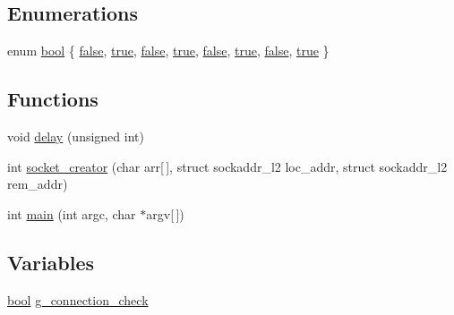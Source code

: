 \subsection*{Enumerations}
\begin{DoxyCompactItemize}
\item 
enum \mbox{\hyperlink{piconet_2l2cap-server_8c_af6a258d8f3ee5206d682d799316314b1}{bool}} \{ \newline
\mbox{\hyperlink{piconet_2l2cap-client_8c_af6a258d8f3ee5206d682d799316314b1ae9de385ef6fe9bf3360d1038396b884c}{false}}, 
\mbox{\hyperlink{piconet_2l2cap-client_8c_af6a258d8f3ee5206d682d799316314b1a08f175a5505a10b9ed657defeb050e4b}{true}}, 
\mbox{\hyperlink{piconet_2l2cap-server_8c_af6a258d8f3ee5206d682d799316314b1ae9de385ef6fe9bf3360d1038396b884c}{false}}, 
\mbox{\hyperlink{piconet_2l2cap-server_8c_af6a258d8f3ee5206d682d799316314b1a08f175a5505a10b9ed657defeb050e4b}{true}}, 
\newline
\mbox{\hyperlink{connection__handler_8c_af6a258d8f3ee5206d682d799316314b1ae9de385ef6fe9bf3360d1038396b884c}{false}}, 
\mbox{\hyperlink{connection__handler_8c_af6a258d8f3ee5206d682d799316314b1a08f175a5505a10b9ed657defeb050e4b}{true}}, 
\mbox{\hyperlink{tcpserver_2l2cap-client_8c_af6a258d8f3ee5206d682d799316314b1ae9de385ef6fe9bf3360d1038396b884c}{false}}, 
\mbox{\hyperlink{tcpserver_2l2cap-client_8c_af6a258d8f3ee5206d682d799316314b1a08f175a5505a10b9ed657defeb050e4b}{true}}
 \}
\end{DoxyCompactItemize}
\subsection*{Functions}
\begin{DoxyCompactItemize}
\item 
void \mbox{\hyperlink{piconet_2l2cap-server_8c_ab3c8f8e0f1f9dff62601907d999cf934}{delay}} (unsigned int)
\item 
int \mbox{\hyperlink{piconet_2l2cap-server_8c_a5481465d905370f659d6592b0fa4bd0d}{socket\+\_\+creator}} (char arr\mbox{[}$\,$\mbox{]}, struct sockaddr\+\_\+l2 loc\+\_\+addr, struct sockaddr\+\_\+l2 rem\+\_\+addr)
\item 
int \mbox{\hyperlink{piconet_2l2cap-server_8c_a0ddf1224851353fc92bfbff6f499fa97}{main}} (int argc, char $\ast$argv\mbox{[}$\,$\mbox{]})
\end{DoxyCompactItemize}
\subsection*{Variables}
\begin{DoxyCompactItemize}
\item 
\mbox{\hyperlink{piconet_2l2cap-client_8c_af6a258d8f3ee5206d682d799316314b1}{bool}} \mbox{\hyperlink{piconet_2l2cap-server_8c_a81bc6941c354c1be6ad9931b4f2b50bf}{g\+\_\+connection\+\_\+check}}
\end{DoxyCompactItemize}


